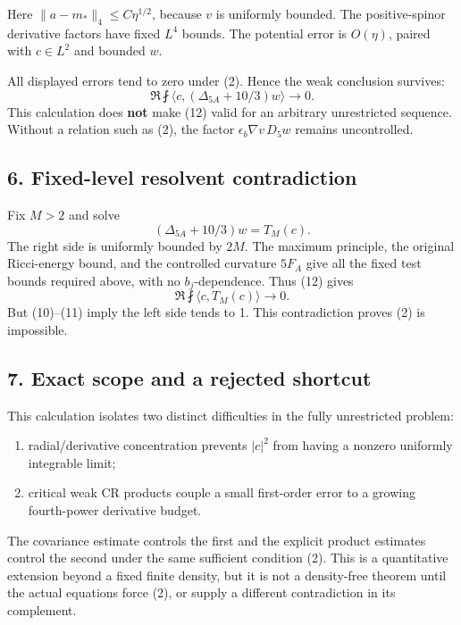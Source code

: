 \documentclass[
]{article}
\providecommand{\tightlist}{%
  \setlength{\itemsep}{0pt}\setlength{\parskip}{0pt}}
\begin{document}
Here \(\|a-m_*\|_4\le C\eta^{1/2}\), because \(v\) is uniformly bounded.
The positive-spinor derivative factors have fixed \(L^4\) bounds. The
potential error is \(O(\eta)\), paired with \(c\in L^2\) and bounded
\(w\).

All displayed errors tend to zero under (2). Hence the weak conclusion
survives: \[
 \Re\fint\langle c,(\Delta_{5A}+10/3)w\rangle\longrightarrow0. \tag{12}
\] This calculation does \textbf{not} make (12) valid for an arbitrary
unrestricted sequence. Without a relation such as (2), the factor
\(\epsilon_b\nabla v\,D_5w\) remains uncontrolled.

\hypertarget{fixed-level-resolvent-contradiction}{%
\subsection{6. Fixed-level resolvent
contradiction}\label{fixed-level-resolvent-contradiction}}

Fix \(M>2\) and solve \[
 (\Delta_{5A}+10/3)w=T_M(c).
\] The right side is uniformly bounded by \(2M\). The maximum principle,
the original Ricci-energy bound, and the controlled curvature \(5F_A\)
give all the fixed test bounds required above, with no
\(b_j\)-dependence. Thus (12) gives \[
 \Re\fint\langle c,T_M(c)\rangle\longrightarrow0.
\] But (10)--(11) imply the left side tends to 1. This contradiction
proves (2) is impossible.

\hypertarget{exact-scope-and-a-rejected-shortcut}{%
\subsection{7. Exact scope and a rejected
shortcut}\label{exact-scope-and-a-rejected-shortcut}}

This calculation isolates two distinct difficulties in the fully
unrestricted problem:

\begin{enumerate}
\def\labelenumi{\arabic{enumi}.}
\tightlist
\item
  radial/derivative concentration prevents \(|c|^2\) from having a
  nonzero uniformly integrable limit;
\item
  critical weak CR products couple a small first-order error to a
  growing fourth-power derivative budget.
\end{enumerate}

The covariance estimate controls the first and the explicit product
estimates control the second under the same sufficient condition (2).
This is a quantitative extension beyond a fixed finite density, but it
is not a density-free theorem until the actual equations force (2), or
supply a different contradiction in its complement.
\end{document}
